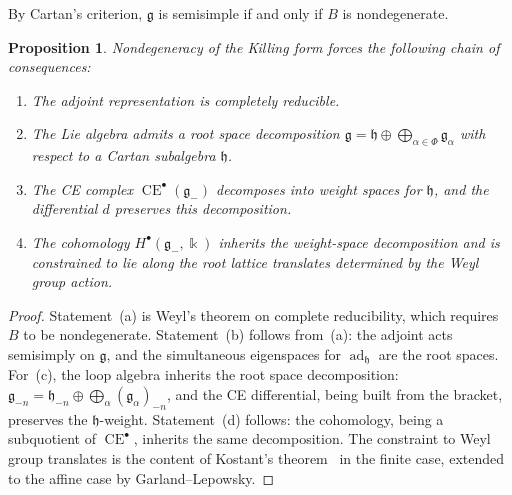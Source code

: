 \documentclass[11pt,reqno]{amsart}
\theoremstyle{plain}
\newtheorem{proposition}[theorem]{Proposition}
\theoremstyle{definition}
\theoremstyle{remark}
\DeclareMathOperator{\CE}{CE}
\DeclareMathOperator{\ad}{ad}
\newcommand{\fg}{\mathfrak{g}}
\newcommand{\fh}{\mathfrak{h}}
\newcommand{\gminus}{\fg_{-}}
\newcommand{\kk}{\Bbbk}
\begin{document}
By Cartan's criterion, $\fg$ is semisimple if and only if $B$ is
nondegenerate.

\begin{proposition}\label{prop:killing-concentration}
 Nondegeneracy of the Killing form forces the following chain of consequences:
 \begin{enumerate}[label=(\alph*)]
 \item The adjoint representation is completely reducible.
 \item The Lie algebra admits a root space decomposition $\fg = \fh \oplus
 \bigoplus_{\alpha \in \Phi} \fg_\alpha$ with respect to a Cartan
 subalgebra $\fh$.
 \item The CE complex $\CE^\bullet(\gminus)$ decomposes into weight spaces
 for $\fh$, and the differential $d$ preserves this decomposition.
 \item The cohomology $H^\bullet(\gminus, \kk)$ inherits the weight-space
 decomposition and is constrained to lie along the root lattice
 translates determined by the Weyl group action.
 \end{enumerate}
\end{proposition}

\begin{proof}
 Statement~(a) is Weyl's theorem on complete reducibility, which requires
 $B$ to be nondegenerate. Statement~(b) follows from~(a): the adjoint
 acts semisimply on $\fg$, and the simultaneous eigenspaces for $\ad_\fh$
 are the root spaces. For~(c), the loop algebra inherits the root space
 decomposition: $\fg_{-n} = \fh_{-n} \oplus \bigoplus_\alpha
 (\fg_\alpha)_{-n}$, and the CE differential, being built from the bracket,
 preserves the $\fh$-weight. Statement~(d) follows: the cohomology,
 being a subquotient of $\CE^\bullet$, inherits the same decomposition.
 The constraint to Weyl group translates is the content of Kostant's
 theorem~\cite{Kostant61} in the finite case, extended to the affine case
 by Garland--Lepowsky.
\end{proof}
\end{document}
